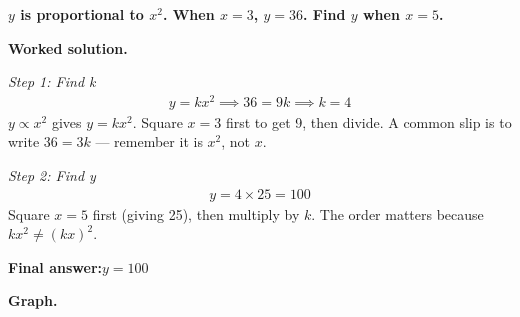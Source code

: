 \documentclass[11pt]{article}
\newcommand{\question}[1]{\par\medskip\noindent\textbf{#1}\par}
\begin{document}
\question{\( y \) is proportional to \( x^2 \). When \( x = 3 \), \( y = 36 \). Find \( y \) when \( x = 5 \).}

\textbf{Worked solution.}

\textit{Step 1: Find k}
\[\begin{gathered}
y = kx^2 \implies 36 = 9k \implies k = 4
\end{gathered}\]
\( y \propto x^2 \) gives \( y = kx^2 \). Square \( x = 3 \) first to get 9, then divide. A common slip is to write \( 36 = 3k \) --- remember it is \( x^2 \), not \( x \).

\textit{Step 2: Find y}
\[\begin{gathered}
y = 4 \times 25 = 100
\end{gathered}\]
Square \( x = 5 \) first (giving 25), then multiply by \( k \). The order matters because \( kx^2 \neq (kx)^2 \).

\begin{answerbox}
\textbf{Final answer:}\quad \(\displaystyle y = 100\)
\end{answerbox}
\textbf{Graph.}
\end{document}
